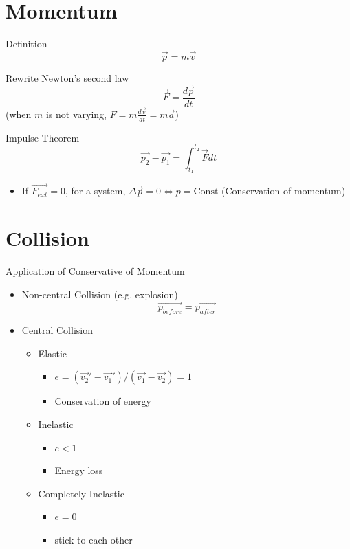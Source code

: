 \documentclass{beamer}
\begin{document}
\section{Momentum}
\begin{frame}
  \begin{block}{Definition}
    $$\vec{p} = m\vec{v}$$
  \end{block}\pause
  \begin{block}{Rewrite Newton's second law}
    $$\vec{F}=\frac{d\vec{p}}{dt}$$ (when $m$ is not varying, $F = m\frac{d\vec{v}}{dt}=m\vec{a}$)
  \end{block}\pause
  \begin{block}{Impulse Theorem}
    $$\vec{p_2}-\vec{p_1}=\int_{t_1}^{t_2}\vec{F}dt$$
  \end{block}\pause
  \begin{itemize}
    \item If $\vec{F_{ext}} = 0$, for a system, $\Delta\vec{p} = 0 \Leftrightarrow p = \text{Const}$ (Conservation of momentum)
  \end{itemize}
\end{frame}

\section{Collision}
\begin{frame}{Application of Conservative of Momentum}
  \begin{itemize}
    \item Non-central Collision (e.g. explosion)
    $$\vec{p_{before}} = \vec{p_{after}}$$\pause
    \item Central Collision
    \begin{itemize}
      \item Elastic
      \begin{itemize}
        \item $e = (\vec{v_2}'-\vec{v_1}')/(\vec{v_1}-\vec{v_2})= 1$
        \item Conservation of energy
      \end{itemize}\pause
      \item Inelastic
      \begin{itemize}
        \item $e < 1$
        \item Energy loss
      \end{itemize}\pause
      \item Completely Inelastic
      \begin{itemize}
        \item $e = 0$
        \item stick to each other
      \end{itemize}
    \end{itemize}
  \end{itemize}
\end{frame}
\end{document}
